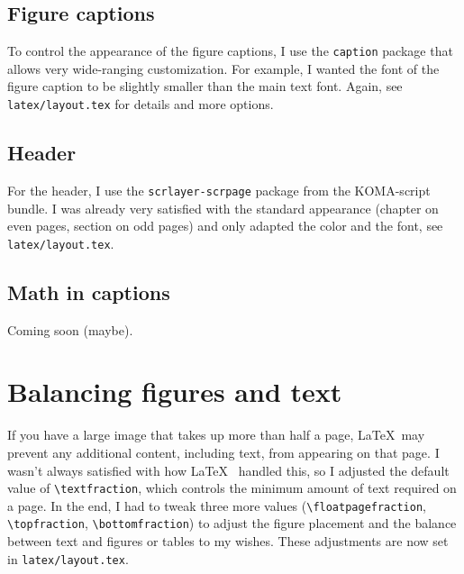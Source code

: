 \subsection{Figure captions}
To control the appearance of the figure captions, I use the \verb|caption| package that allows very wide-ranging customization. For example, I wanted the font of the figure caption to be slightly smaller than the main text font. Again, see \verb|latex/layout.tex| for details and more options.

\subsection{Header}
For the header, I use the \verb|scrlayer-scrpage| package from the KOMA-script bundle. I was already very satisfied with the standard appearance (chapter on even pages, section on odd pages) and only adapted the color and the font, see \verb|latex/layout.tex|.

\subsection{Math in captions}
Coming soon (maybe).

\section{Balancing figures and text}
If you have a large image that takes up more than half a page, \LaTeX~may prevent any additional content, including text, from appearing on that page. I wasn’t always satisfied with how \LaTeX~ handled this, so I adjusted the default value of \verb|\textfraction|, which controls the minimum amount of text required on a page. In the end, I had to tweak three more values (\verb|\floatpagefraction|, \verb|\topfraction|, \verb|\bottomfraction|) to adjust the figure placement and the balance between text and figures or tables to my wishes. These adjustments are now set in \verb|latex/layout.tex|.
